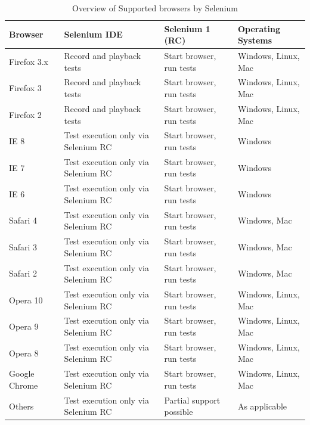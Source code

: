 \documentclass[article,type=msc,colorback,accentcolor=tud9c,twoside,11pt]{tudthesis}
\begin{document}
\begin{table}[H]
\centering
\begin{tabular}{|l|l|l|l|}
	\hline
	\textbf{Browser} & \textbf{Selenium IDE} & \textbf{Selenium 1 (RC)} 
	& \textbf{Operating Systems}\\ \hline
	Firefox 3.x   & Record and playback tests             & Start browser, run tests  & Windows, Linux, Mac    \\ \hline
	
	Firefox 3  & Record and playback tests             & Start browser, run tests  & Windows, Linux, Mac    \\ \hline
	
	Firefox 2  & Record and playback tests             & Start browser, run tests  & Windows, Linux, Mac    \\ \hline
	
	IE 8  & Test execution only via Selenium RC             & Start browser, run tests  & Windows    \\ \hline
	
	IE 7  & Test execution only via Selenium RC             & Start browser, run tests  & Windows    \\ \hline
	
	IE 6  & Test execution only via Selenium RC             & Start browser, run tests  & Windows    \\ \hline
	
	Safari 4  & Test execution only via Selenium RC             & Start browser, run tests  & Windows, Mac    \\ \hline
	
	Safari 3  & Test execution only via Selenium RC             & Start browser, run tests  & Windows, Mac    \\ \hline
	
	Safari 2  & Test execution only via Selenium RC             & Start browser, run tests  & Windows, Mac    \\ \hline
	
	Opera 10  & Test execution only via Selenium RC             & Start browser, run tests  & Windows, Linux, Mac    \\ \hline
	
	Opera 9  & Test execution only via Selenium RC             & Start browser, run tests  & Windows, Linux, Mac    \\ \hline
	
	Opera 8  & Test execution only via Selenium RC             & Start browser, run tests  & Windows, Linux, Mac    \\ \hline
	
	Google Chrome  & Test execution only via Selenium RC             & Start browser, run tests  & Windows, Linux, Mac    \\ \hline
	
	Others  & Test execution only via Selenium RC             & Partial support possible  & As applicable    \\ \hline
\end{tabular}
\caption{Overview of Supported browsers by Selenium}
\label{SB}
\end{table}
\end{document}
